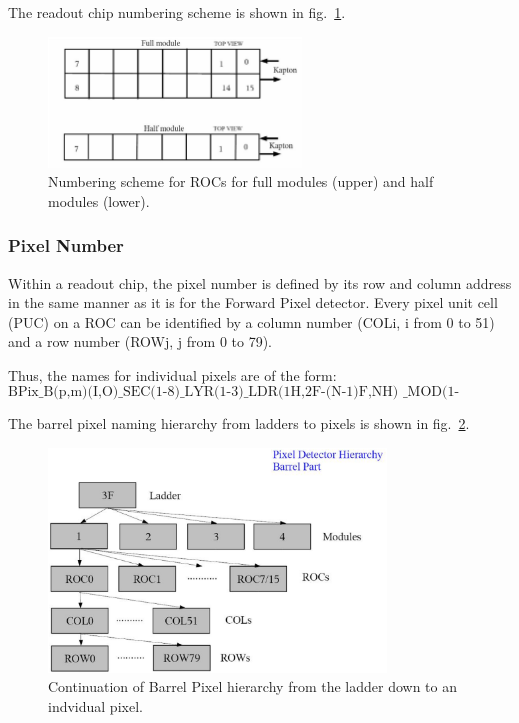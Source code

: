 \documentclass{cmspaper}
\begin{document}
The readout chip numbering scheme is shown in fig.~\ref{figure:barrel_roc}.

\begin{figure}[hbtp] 
  \begin{center} 
        \includegraphics[width =0.6\textwidth]{barrel_roc_numbering.eps} 
    \caption{Numbering scheme for ROCs for full modules (upper) and
half modules (lower).} 
    \label{figure:barrel_roc} 
  \end{center} 
\end{figure} 


\subsubsection{Pixel Number}

Within a readout chip, the pixel number is defined by its row and column 
address in the same manner as it is for the Forward Pixel detector.
Every pixel unit cell (PUC) on a ROC can be identified by a column number 
(COLi, i from 0 to 51) and a row number (ROWj, j from 0 to 79).

Thus, the names for individual pixels are of the form:
\begin{displaymath}
\mbox{BPix\_B(p,m)(I,O)\_SEC(1-8)\_LYR(1-3)\_LDR(1H,2F-(N-1)F,NH)
\_MOD(1-4)\_ROC(0-(7,15))\_COL(0-51)\_ROW(0-79).}
\end{displaymath}

The barrel pixel naming hierarchy from ladders to pixels is shown in
fig.~\ref{figure:barrel_hier2}.

\begin{figure}[hbtp] 
  \begin{center} 
        \includegraphics[width =0.8\textwidth]{barrel_hierarchy_2.eps} 
    \caption{Continuation of Barrel Pixel hierarchy from the ladder down to 
an indvidual pixel.} 
    \label{figure:barrel_hier2} 
  \end{center} 
\end{figure} 
\end{document}
